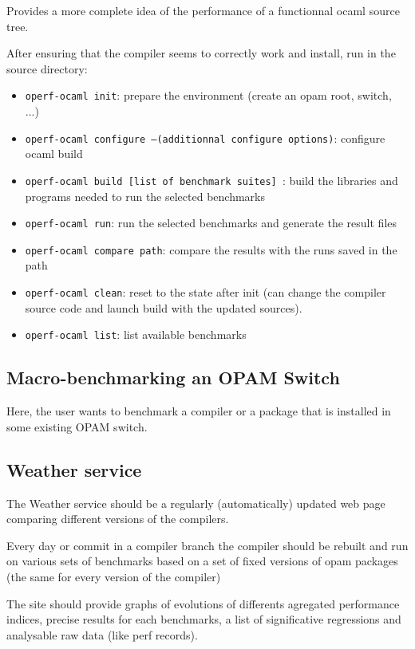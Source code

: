 \documentclass[11pt,a4paper]{article}
\begin{document}
Provides a more complete idea of the performance of a functionnal
ocaml source tree.

After ensuring that the compiler seems to correctly work and install,
run in the source directory:

\begin{itemize}
\item {\tt operf-ocaml init}: prepare the environment (create an opam root, switch, ...)
\item {\tt operf-ocaml configure  --(additionnal configure options)}: configure ocaml build
\item {\tt operf-ocaml build [list of benchmark suites] }: build the
  libraries and programs needed to run the selected benchmarks
\item {\tt operf-ocaml run}: run the selected benchmarks and generate the result files
\item {\tt operf-ocaml compare path}: compare the results with the runs saved in the path
\item {\tt operf-ocaml clean}: reset to the state after init (can change the compiler source code and launch build with the updated sources).
\item {\tt operf-ocaml list}: list available benchmarks
\end{itemize}

\subsection{Macro-benchmarking an OPAM Switch}

Here, the user wants to benchmark a compiler or a package that is
installed in some existing OPAM switch.

\subsection{Weather service}

The Weather service should be a regularly (automatically) updated web
page comparing different versions of the compilers.

Every day or commit in a compiler branch the compiler should be
rebuilt and run on various sets of benchmarks based on a set of fixed
versions of opam packages (the same for every version of the compiler)

The site should provide graphs of evolutions of differents agregated
performance indices, precise results for each benchmarks, a list of
significative regressions and analysable raw data (like perf records).
\end{document}
